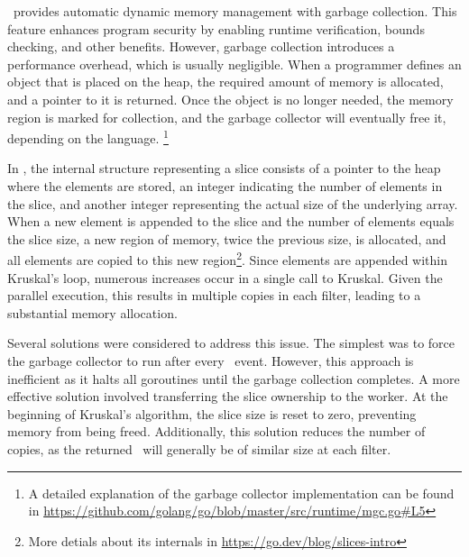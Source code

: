 \Go\ provides automatic dynamic memory management with garbage collection. This feature enhances program security by enabling runtime verification, bounds checking, and other benefits. However, garbage collection introduces a performance overhead, which is usually negligible. When a programmer defines an object that is placed on the heap, the required amount of memory is allocated, and a pointer to it is returned. Once the object is no longer needed, the memory region is marked for collection, and the garbage collector will eventually free it, depending on the language. \footnote{A detailed explanation of the garbage collector implementation can be found in \href{https://github.com/golang/go/blob/master/src/runtime/mgc.go\#L5}{https://github.com/golang/go/blob/master/src/runtime/mgc.go\#L5}}

In \Go, the internal structure representing a slice consists of a pointer to the heap where the elements are stored, an integer indicating the number of elements in the slice, and another integer representing the actual size of the underlying array. When a new element is appended to the slice and the number of elements equals the slice size, a new region of memory, twice the previous size, is allocated, and all elements are copied to this new region\footnote{More detials about its internals in \href{https://go.dev/blog/slices-intro}{https://go.dev/blog/slices-intro}}. Since elements are appended within Kruskal's loop, numerous increases occur in a single call to Kruskal. Given the parallel execution, this results in multiple copies in each filter, leading to a substantial memory allocation.

Several solutions were considered to address this issue. The simplest was to force the garbage collector to run after every \opmst\ event. However, this approach is inefficient as it halts all goroutines until the garbage collection completes. A more effective solution involved transferring the slice ownership to the worker. At the beginning of Kruskal's algorithm, the slice size is reset to zero, preventing memory from being freed. Additionally, this solution reduces the number of copies, as the returned \mst\ will generally be of similar size at each filter.
